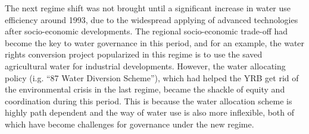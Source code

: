\documentclass[9pt, twocolumn, twoside, lineno]{pnas-new}
\begin{document}
The next regime shift was not brought until a significant increase in water use efficiency around 1993, due to the widespread applying of advanced technologies after socio-economic developments. 
The regional socio-economic trade-off had become the key to water governance in this period, and for an example, the water rights conversion project popularized in this regime is to use the saved agricultural water for industrial developments.
However, the water allocating policy (i.g. ``87 Water Diversion Scheme''), which had helped the YRB get rid of the environmental crisis in the last regime, became the shackle of equity and coordination during this period.
This is because the water allocation scheme is highly path dependent and the way of water use is also more inflexible, both of which have become challenges for governance under the new regime.
\end{document}

